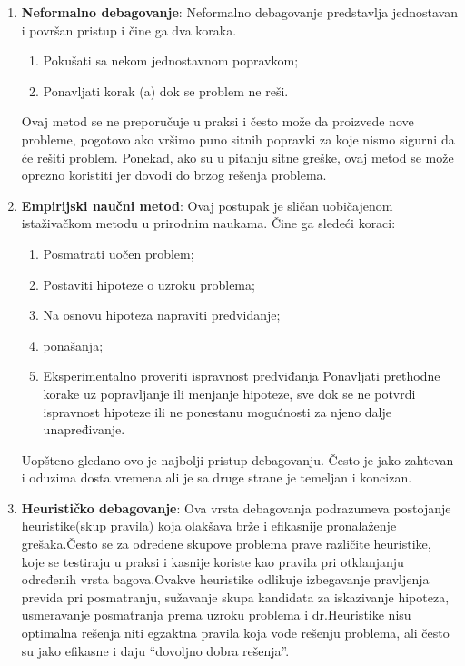 \documentclass[a4paper]{article}
\begin{document}
\begin{enumerate}
	\item \textbf{Neformalno debagovanje}: Neformalno debagovanje predstavlja jednostavan i površan pristup i čine ga dva koraka.
	\begin{enumerate}
		\item Pokušati sa nekom jednostavnom popravkom;
		\item Ponavljati korak (a) dok se problem ne reši.
	\end{enumerate}
	Ovaj metod se ne preporučuje u praksi i često može da proizvede nove probleme, pogotovo ako vršimo puno sitnih popravki za koje nismo sigurni da će rešiti problem. Ponekad, ako su u pitanju sitne greške, ovaj metod se može oprezno koristiti jer dovodi do brzog rešenja problema.\cite{bagovi_smalkov}
	
	\item \textbf{Empirijski naučni metod}:
	Ovaj postupak je sličan uobičajenom istaživačkom metodu u prirodnim naukama.
	Čine ga sledeći koraci:
	\begin{enumerate}
		\item Posmatrati uočen problem;
		\item Postaviti hipoteze o uzroku problema;
		\item Na osnovu hipoteza napraviti predviđanje; \item ponašanja;
		\item Eksperimentalno proveriti ispravnost predviđanja
		Ponavljati prethodne korake uz popravljanje ili menjanje hipoteze, sve dok se ne potvrdi ispravnost hipoteze ili ne ponestanu mogućnosti za njeno dalje unapređivanje.
	\end{enumerate}
	\indent Uopšteno gledano ovo je najbolji pristup debagovanju. Često je jako zahtevan i oduzima dosta vremena ali je sa druge strane je temeljan i koncizan.\cite{bagovi_smalkov}
	
	
	\item \textbf{Heurističko debagovanje}:
	Ova vrsta debagovanja podrazumeva postojanje heuristike(skup pravila) koja olakšava brže i efikasnije pronalaženje grešaka.Često se za određene skupove problema prave različite heuristike, koje se testiraju u praksi i kasnije koriste kao pravila pri otklanjanju određenih vrsta bagova.Ovakve heuristike odlikuje izbegavanje pravljenja previda pri posmatranju, sužavanje skupa kandidata za iskazivanje hipoteza, usmeravanje posmatranja prema uzroku problema i dr.Heuristike nisu optimalna rešenja niti egzaktna pravila koja vode rešenju problema, ali često su jako efikasne i daju “dovoljno dobra rešenja”.\cite{bagovi_smalkov}
\end{enumerate}
\end{document}
